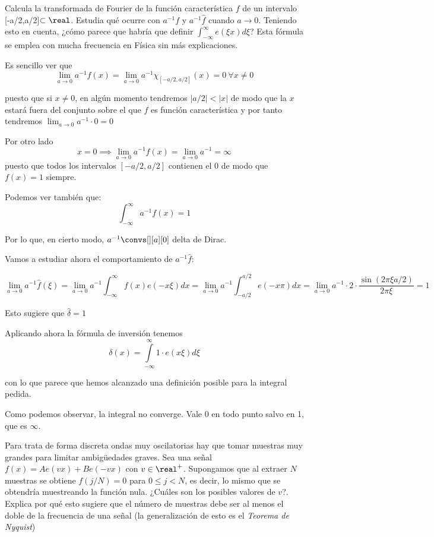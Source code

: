 \begin{problem}[4]
	Calcula la transformada de Fourier de la función característica $f$ de un intervalo [-a/2,a/2]$\subset \real$. Estudia qué ocurre con $a^{-1}f$ y $a^{-1}\hat{f}$ cuando $a \to 0$. Teniendo esto en cuenta, ¿cómo parece que habría que definir $\int_{-\infty}^{\infty}e(\xi x)d\xi $? Esta fórmula se emplea con mucha frecuencia en Física sin más explicaciones.

	\solution
	Es sencillo ver que
	\[\lim_{a \rightarrow 0} a^{-1} f(x) = \lim_{a \rightarrow 0} a^{-1} \chi_{[-a/2,a/2]} (x) = 0\ \forall x\neq 0\]

	puesto que si $x \neq 0$, en algún momento tendremos $|a/2| < |x|$ de modo que la $x$ estará fuera del conjunto sobre el que $f$ es función característica y por tanto tendremos $ \lim_{a \rightarrow 0} a^{-1} \cdot 0 = 0$

	Por otro lado
	\[x = 0 \implies \lim_{a \rightarrow 0} a^{-1} f(x) = \lim_{a \rightarrow 0} a^{-1} = \infty \]
	puesto que todos los intervalos $[-a/2,a/2]$ contienen el 0 de modo que $f(x)=1$ siempre.

	Podemos ver también que:
	$$\int^{\infty}_{-\infty} a^{-1} f(x) = 1 $$

	Por lo que, en cierto modo, $a^{-1} \convs[][a][0]$ delta de Dirac.

	Vamos a estudiar ahora el comportamiento de $a^{-1}\hat{f}$:

	$$\lim_{a \rightarrow 0} a^{-1} \hat{f}(\xi) = \lim_{a \rightarrow 0} a^{-1} \int^{\infty}_{-\infty} f(x) e(-x \xi) dx = \lim_{a \rightarrow 0} a^{-1} \int^{a/2}_{-a/2} e(-x\pi) dx = \lim_{a \rightarrow 0} a^{-1} \cdot 2 \cdot \frac{\sin (2 \pi \xi a/2)}{2 \pi \xi} =1 $$

	Esto sugiere que $\hat{\delta} = 1$

	Aplicando ahora la fórmula de inversión  tenemos
	\[\delta (x) = \int\limits^{\infty}_{-\infty} 1 \cdot e(x \xi) d \xi\]

	con lo que parece que hemos alcanzado una definición posible para la integral pedida.

	\obs Como podemos observar, la integral no converge. Vale $0$ en todo punto salvo en 1, que es $\infty$.

\end{problem}

\begin{problem}[5]
Para trata de forma discreta ondas muy oscilatorias hay que tomar muestras muy grandes para limitar ambigüedades graves. Sea una señal $f(x)=Ae(vx)+Be(-vx)$ con $v \in \real^+$. Supongamos que al extraer $N$ muestras se obtiene $f(j/N)=0$ para $0 \leq j < N$, es decir, lo mismo que se obtendría muestreando la función nula. ¿Cuáles son los posibles valores de $v$?. Explica por qué esto sugiere que el número de muestras debe ser al menos el doble de la frecuencia de una señal (la generalización de esto es el \textit{Teorema de Nyquist})
\solution


\end{problem}

